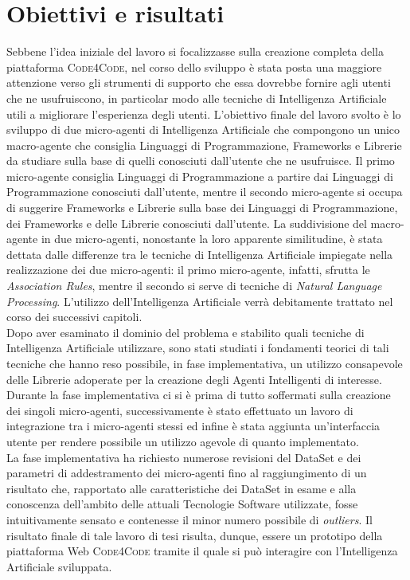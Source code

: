 \section{Obiettivi e risultati}
Sebbene l'idea iniziale del lavoro si focalizzasse sulla creazione completa della piattaforma \textsc{Code4Code}, nel corso dello sviluppo è stata posta una maggiore attenzione verso gli strumenti di supporto che essa dovrebbe fornire agli utenti che ne usufruiscono, in particolar modo alle tecniche di Intelligenza Artificiale utili a migliorare l'esperienza degli utenti. L'obiettivo finale del lavoro svolto è lo sviluppo di due micro-agenti di Intelligenza Artificiale che compongono un unico macro-agente che consiglia Linguaggi di Programmazione, Frameworks e Librerie da studiare sulla base di quelli conosciuti dall'utente che ne usufruisce. Il primo micro-agente consiglia Linguaggi di Programmazione a partire dai Linguaggi di Programmazione conosciuti dall'utente, mentre il secondo micro-agente si occupa di suggerire Frameworks e Librerie sulla base dei Linguaggi di Programmazione, dei Frameworks e delle Librerie conosciuti dall'utente. La suddivisione del macro-agente in due micro-agenti, nonostante la loro apparente similitudine, è stata dettata dalle differenze tra le tecniche di Intelligenza Artificiale impiegate nella realizzazione dei due micro-agenti: il primo micro-agente, infatti, sfrutta le \emph{Association Rules}, mentre il secondo si serve di tecniche di \emph{Natural Language Processing}. L'utilizzo dell'Intelligenza Artificiale verrà debitamente trattato nel corso dei successivi capitoli.\\Dopo aver esaminato il dominio del problema e stabilito quali tecniche di Intelligenza Artificiale utilizzare, sono stati studiati i fondamenti teorici di tali tecniche che hanno reso possibile, in fase implementativa, un utilizzo consapevole delle Librerie adoperate per la creazione degli Agenti Intelligenti di interesse. Durante la fase implementativa ci si è prima di tutto soffermati sulla creazione dei singoli micro-agenti, successivamente è stato effettuato un lavoro di integrazione tra i micro-agenti stessi ed infine è stata aggiunta un'interfaccia utente per rendere possibile un utilizzo agevole di quanto implementato.\\La fase implementativa ha richiesto numerose revisioni del DataSet e dei parametri di addestramento dei micro-agenti fino al raggiungimento di un risultato che, rapportato alle caratteristiche dei DataSet in esame e alla conoscenza dell'ambito delle attuali Tecnologie Software utilizzate, fosse intuitivamente sensato e contenesse il minor numero possibile di \emph{outliers}. Il risultato finale di tale lavoro di tesi risulta, dunque, essere un prototipo della piattaforma Web \textsc{Code4Code} tramite il quale si può interagire con l'Intelligenza Artificiale sviluppata.  
